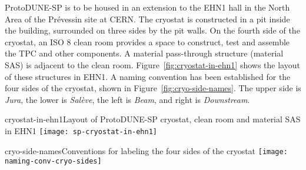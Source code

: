 
\label{ch:spacereq}

ProtoDUNE-SP is to be housed in an extension to the EHN1 hall in the North Area of the Pr\'{e}vessin site at CERN. 
The cryostat is constructed in a pit inside the building, surrounded on three sides by the pit walls.  On the fourth side of the cryostat, an ISO 8 clean room provides a space to construct, test and assemble the TPC and other components. 
A material pass-through structure (material SAS) is adjacent to the clean room. Figure~\ref{fig:cryostat-in-ehn1} shows the layout of these structures in EHN1. A naming convention has been established for the four sides of the cryostat, shown in Figure~\ref{fig:cryo-side-names}.  The upper side is \textit{Jura}, the lower is \textit{Sal\`{e}ve}, the left is \textit{Beam}, and right is \textit{Downstream}.




\begin{cdrfigure}{cryostat-in-ehn1}{Layout of ProtoDUNE-SP cryostat, clean room and material SAS in EHN1}
\texttt{[image: sp-cryostat-in-ehn1]}
\end{cdrfigure}


\begin{cdrfigure}{cryo-side-names}{Conventions for labeling the four sides of the cryostat}
\texttt{[image: naming-conv-cryo-sides]}
\end{cdrfigure}

